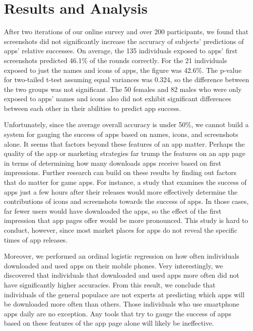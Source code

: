 \section{Results and Analysis}


After two iterations of our online survey and over 200 participants, we found that screenshots did not significantly increase the accuracy of subjects' predictions of apps' relative successes. On average, the 135 individuals exposed to apps' first screenshots predicted 46.1\% of the rounds correctly. For the 21 individuals exposed to just the names and icons of apps, the figure was 42.6\%. The p-value for two-tailed t-test assuming equal variances was 0.324, so the difference between the two groups was not significant. The 50 females and 82 males who were only exposed to apps' names and icons also did not exhibit significant differences between each other in their abilities to predict app success.

Unfortunately, since the average overall accuracy is under 50\%, we cannot build a system for gauging the success of apps based on names, icons, and screenshots alone. It seems that factors beyond these features of an app matter. Perhaps the quality of the app or marketing strategies far trump the features on an app page in terms of determining how many downloads apps receive based on first impressions. Further research can build on these results by finding out factors that do matter for game apps. For instance, a study that examines the success of apps just a few hours after their releases would more effectively determine the contributions of icons and screenshots towards the success of apps. In those cases, far fewer users would have downloaded the apps, so the effect of the first impression that app pages offer would be more pronounced. This study is hard to conduct, however, since most market places for apps do not reveal the specific times of app releases.

Moreover, we  performed an ordinal logistic regression on how often individuals downloaded and used apps on their mobile phones. Very interestingly, we discovered that individuals that downloaded and used apps more often did not have significantly higher accuracies. From this result, we conclude that individuals of the general populace are not experts at predicting which apps will be downloaded more often than others. Those individuals who use smartphone apps daily are no exception. Any tools that try to gauge the success of apps based on these features of the app page alone will likely be ineffective.